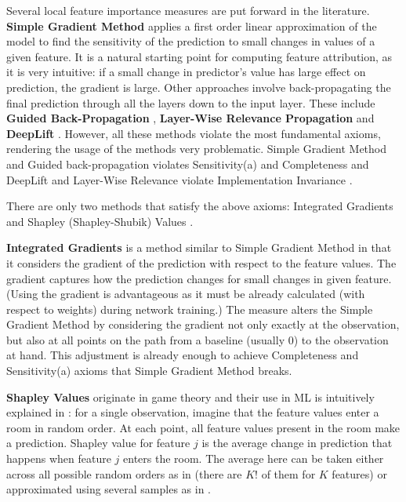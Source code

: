 			Several local feature importance measures are put forward in the literature. \textbf{Simple Gradient Method} \citep{baehrens2010explain} applies a first order linear approximation of the model to find the sensitivity of the prediction to small changes in values of a given feature. It is a natural starting point for computing feature attribution, as it is very intuitive: if a small change in predictor's value has large effect on prediction, the gradient is large. Other approaches involve back-propagating the final prediction through all the layers down to the input layer. These include  \textbf{Guided Back-Propagation} \citep{springenberg2014striving}, \textbf{Layer-Wise Relevance Propagation} \citep{binder2016layer} and \textbf{DeepLift} \citep{shrikumar2017learning}. However, all these methods violate the most fundamental axioms, rendering the usage of the methods very problematic. Simple Gradient Method and Guided back-propagation violates Sensitivity(a) and Completeness and DeepLift and Layer-Wise Relevance violate Implementation Invariance \citep{shrikumar2017learning, sundararajan2017axiomatic}.
			
			There are only two methods that satisfy the above axioms: Integrated Gradients \citep{sundararajan2017axiomatic} and Shapley (Shapley-Shubik) Values \citep{shapley1971assignment}. 	
			
			\textbf{ Integrated Gradients} \citep{sundararajan2017axiomatic} is a method similar to Simple Gradient Method in that it considers the gradient of the prediction with respect to the feature values. The gradient captures how the prediction changes for small changes in given feature. (Using the gradient is advantageous as it must be already calculated (with respect to weights) during network training.) The measure alters the Simple Gradient Method by considering the gradient not only exactly at the observation, but also at all points on the path from a baseline (usually $0$) to the observation at hand. This adjustment is already enough to achieve Completeness and Sensitivity(a) axioms that Simple Gradient Method breaks. 
			
			\textbf{Shapley Values} originate in game theory and their use in ML is intuitively explained in \cite{molnar2020interpretable}: for a single observation, imagine that the feature values enter a room in random order. At each point, all feature values present in the room make a prediction. Shapley value for feature $j$ is the average change in prediction that happens when feature $j$ enters the room. The average here can be taken either across all possible random orders as in \cite{shapley1971assignment} (there are $K!$ of them for $K$ features) or approximated using several samples as in \cite{vstrumbelj2014explaining}. 
			
